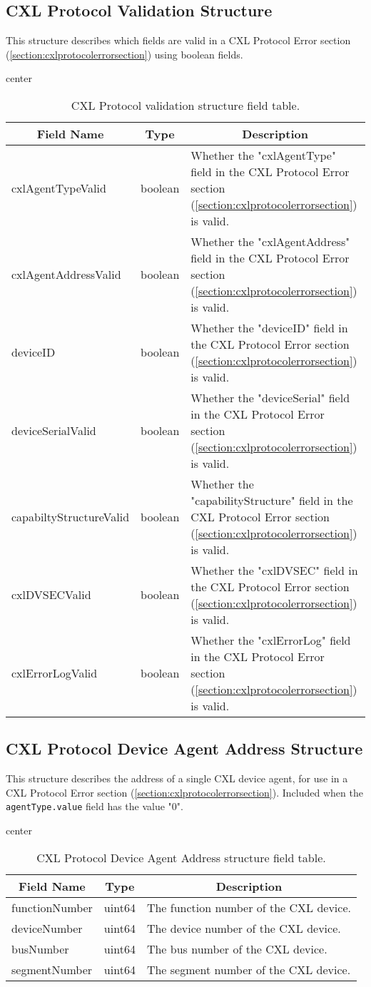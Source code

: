 \documentclass{report}
\newcommand*{\thead}[1]{\multicolumn{1}{|c|}{\bfseries #1}}
\newcommand*{\jsontable}[1]{
    \begin{table}[!ht]
    \label{#1}
    \centering
    \begin{adjustbox}{center}
    \begin{tabular}{|l|c|p{8cm}|}
    \hline
    \thead{Field Name} & \thead{Type} & \thead{Description} \\
    \hline
}
\newcommand*{\jsontableend}[1]{
    \hline
    \end{tabular}
    \end{adjustbox}
    \caption{#1}
    \label{table:#1}
    \end{table}
    \FloatBarrier
}
\begin{document}
\subsection{CXL Protocol Validation Structure}
\label{subsection:cxlprotocolvalidationstructure}
This structure describes which fields are valid in a CXL Protocol Error section (\ref{section:cxlprotocolerrorsection}) using boolean fields.
\jsontable{table:cxlprotocolvalidationstructure}
cxlAgentTypeValid & boolean & Whether the "cxlAgentType" field in the CXL Protocol Error section (\ref{section:cxlprotocolerrorsection}) is valid.\\
\hline
cxlAgentAddressValid & boolean & Whether the "cxlAgentAddress" field in the CXL Protocol Error section (\ref{section:cxlprotocolerrorsection}) is valid.\\
\hline
deviceID & boolean & Whether the "deviceID" field in the CXL Protocol Error section (\ref{section:cxlprotocolerrorsection}) is valid.\\
\hline
deviceSerialValid & boolean & Whether the "deviceSerial" field in the CXL Protocol Error section (\ref{section:cxlprotocolerrorsection}) is valid.\\
\hline
capabiltyStructureValid & boolean & Whether the "capabilityStructure" field in the CXL Protocol Error section (\ref{section:cxlprotocolerrorsection}) is valid.\\
\hline
cxlDVSECValid & boolean & Whether the "cxlDVSEC" field in the CXL Protocol Error section (\ref{section:cxlprotocolerrorsection}) is valid.\\
\hline
cxlErrorLogValid & boolean & Whether the "cxlErrorLog" field in the CXL Protocol Error section (\ref{section:cxlprotocolerrorsection}) is valid.\\
\jsontableend{CXL Protocol validation structure field table.}

\subsection{CXL Protocol Device Agent Address Structure}
\label{subsection:cxlprotocoldeviceagentaddressstructure}
This structure describes the address of a single CXL device agent, for use in a CXL Protocol Error section (\ref{section:cxlprotocolerrorsection}). Included when the \texttt{agentType.value} field has the value "0".
\jsontable{table:cxlprotocoldeviceagentaddressstructure}
functionNumber & uint64 & The function number of the CXL device.\\
\hline
deviceNumber & uint64 & The device number of the CXL device.\\
\hline
busNumber & uint64 & The bus number of the CXL device.\\
\hline
segmentNumber & uint64 & The segment number of the CXL device.\\
\jsontableend{CXL Protocol Device Agent Address structure field table.}
\end{document}
